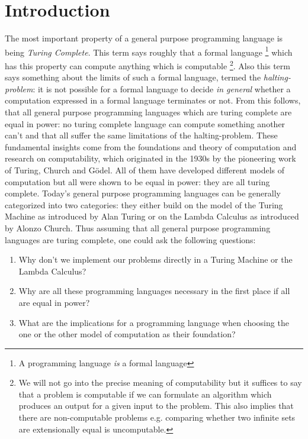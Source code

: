 \chapter{Introduction}
The most important property of a general purpose programming language is being \textit{Turing Complete}. This term says roughly that a formal language \footnote{A programming language \textit{is} a formal language} which has this property can compute anything which is computable \footnote{We will not go into the precise meaning of computability but it suffices to say that a problem is computable if we can formulate an algorithm which produces an output for a given input to the problem. This also implies that there are non-computable problems e.g. comparing whether two infinite sets are extensionally equal is uncomputable.}. Also this term says something about the limits of such a formal language, termed the \textit{halting-problem}: it is not possible for a formal language to decide \textit{in general} whether a computation expressed in a formal language terminates or not. From this follows, that all general purpose programming languages which are turing complete are equal in power: no turing complete language can compute something another can't and that all suffer the same limitations of the halting-problem.
These fundamental insights come from the foundations and theory of computation and research on computability, which originated in the 1930s by the pioneering work of Turing, Church and Gödel. All of them have developed different models of computation but all were shown to be equal in power: they are all turing complete.
Today's general purpose programming languages can be generally categorized into two categories: they either build on the model of the Turing Machine as introduced by Alan Turing or on the Lambda Calculus as introduced by Alonzo Church.
Thus assuming that all general purpose programming languages are turing complete, one could ask the following questions: 

\begin{enumerate}
	\item Why don't we implement our problems directly in a Turing Machine or the Lambda Calculus?
		
	\item Why are all these programming languages necessary in the first place if all are equal in power?

	\item What are the implications for a programming language when choosing the one or the other model of computation as their foundation?
\end{enumerate}

